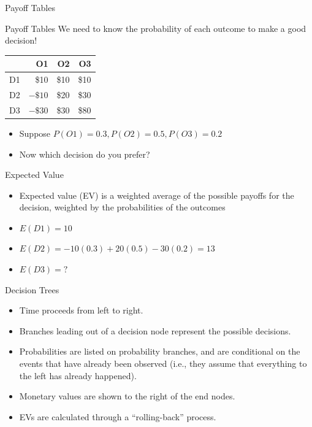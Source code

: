 \documentclass{beamer}\usepackage[]{graphicx}\usepackage[]{color}
\begin{document}
\begin{darkframes}
\begin{frame}[fragile]{Payoff Tables}
      \lc %
    \end{frame}


    \begin{frame}[fragile]{Payoff Tables}
      We need to know the probability of each outcome to make a good decision!
      \begin{center}
        \begin{tabular}{r|rrr}
          & O1 & O2 & O3 \\
          \hline
          D1 & \$10 & \$10 & \$10 \\
          D2 & $-\$10$ & \$20 & \$30 \\
          D3 & $-\$30$ & \$30 & \$80
        \end{tabular}
      \end{center}
        \begin{itemize}
            \item Suppose $P(O1) = 0.3, P(O2) = 0.5, P(O3) = 0.2$
            \item Now which decision do you prefer?
        \end{itemize}

    \end{frame}


    \begin{frame}[fragile]{Expected Value}
         \begin{itemize}[<+->]
            \item Expected value (EV) is a weighted average of the possible payoffs for the decision,
            weighted by the probabilities of the outcomes
            \item $E(D1) = 10$
            \item $E(D2) = -10(0.3) + 20(0.5) - 30(0.2) = 13$
            \item $E(D3) = ?$
        \end{itemize}

      \lc %
    \end{frame}


    \begin{frame}[fragile]{Decision Trees}
          \begin{itemize}
            \item Time proceeds from left to right. \pause
            \item Branches leading out of a decision node represent the possible decisions. \pause
            \item Probabilities are listed on probability branches, and are conditional on the events that have already been observed (i.e., they assume that everything to the left has already happened). \pause
            \item Monetary values are shown to the right of the end nodes. \pause
            \item EVs are calculated through a ``rolling-back'' process.
          \end{itemize}
    \end{frame}



\end{darkframes}
\end{document}

